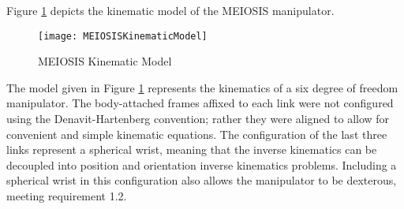 Figure \ref{fig:MEIOSISKinematicModel} depicts the kinematic model of the MEIOSIS manipulator.
\begin{figure}[htp]
  \centering
  \texttt{[image: MEIOSISKinematicModel]}
  \caption{MEIOSIS Kinematic Model \cite{robo}}
  \label{fig:MEIOSISKinematicModel}
\end{figure}
The model given in Figure \ref{fig:MEIOSISKinematicModel} represents the kinematics of a six degree of freedom manipulator. The body-attached frames affixed to each link were not configured using the Denavit-Hartenberg convention; rather they were aligned to allow for convenient and simple kinematic equations. The configuration of the last three links represent a spherical wrist, meaning that the inverse kinematics can be decoupled into position and orientation inverse kinematics problems. Including a spherical wrist in this configuration also allows the manipulator to be dexterous, meeting requirement 1.2.
